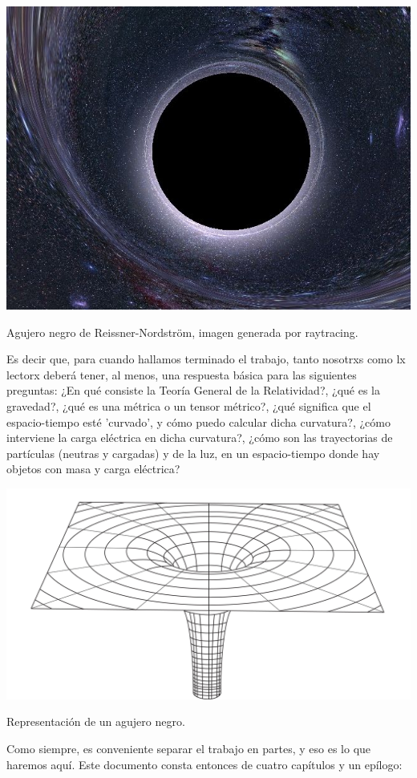 \begin{marginfigure}
\captionsetup{type=figure}
    \centering
    \includegraphics[width=1.3\textwidth]{Im/3653b705a42ad6a980fc834e6ca39875.jpg}
    \caption{Agujero negro de Reissner-Nordström, imagen generada por raytracing.}
    \label{fig:sen}
\end{marginfigure}
Es decir que, para cuando hallamos terminado el trabajo, tanto nosotrxs como lx lectorx deberá tener, al menos, una respuesta básica para las siguientes preguntas: ¿En qué consiste la Teoría General de la Relatividad?, ¿qué es la gravedad?, ¿qué es una métrica o un tensor métrico?, ¿qué significa que el espacio-tiempo esté 'curvado', y cómo puedo calcular dicha curvatura?, ¿cómo interviene la carga eléctrica en dicha curvatura?, ¿cómo son las trayectorias de partículas (neutras y cargadas) y de la luz, en un espacio-tiempo donde hay objetos con masa y carga eléctrica?
\begin{marginfigure}
\captionsetup{type=figure}
    \centering
    \includegraphics[width=1.3\textwidth]{Im/27c518672e8aa2b372107cca7726603f.jpg}
    \caption{Representación de un agujero negro.}
    \label{fig:sen}
\end{marginfigure}
Como siempre, es conveniente separar el trabajo en partes, y eso es lo que haremos aquí. Este documento consta entonces de cuatro capítulos y un epílogo:

